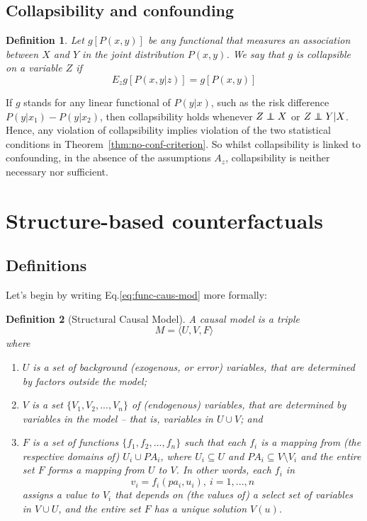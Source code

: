 \documentclass[11pt]{article}
\numberwithin{equation}{section}
\newcommand\indep{\protect\mathpalette{\protect\independenT}{\perp}}
\def\independenT#1#2{\mathrel{\rlap{$#1#2$}\mkern2mu{#1#2}}}
\newtheorem{defn}{Definition}[section]
\begin{document}
\subsection{Collapsibility and confounding}
\begin{defn}
Let $g[P(x,y)]$ be any functional that measures an association between $X$ and $Y$ in the joint distribution $P(x,y)$. We say that $g$ is collapsible on a variable $Z$ if 
\begin{equation}
E_z g[P(x,y|z)] = g[P(x,y)]
\end{equation}
\end{defn}

If $g$ stands for any linear functional of $P(y|x)$, such as the risk difference $P(y|x_1) - P(y|x_2)$, then collapsibility holds whenever $Z \indep X$ or $Z \indep Y| X$. Hence, any violation of collapsibility implies violation of the two statistical conditions in Theorem~\ref{thm:no-conf-criterion}. So whilst collapsibility is linked to confounding, in the absence of the assumptions $A_z$, collapsibility is neither necessary nor sufficient.

\section{Structure-based counterfactuals}
\subsection{Definitions}\label{sec:counterfactual-defs}
Let's begin by writing Eq.\eqref{eq:func-caus-mod} more formally:

\begin{defn}[Structural Causal Model] \label{defn:struct-causal-model}
A causal model is a triple
\begin{equation}
M = \langle U, V, F \rangle \nonumber
\end{equation}
where
\begin{enumerate}[noitemsep]
\item $U$ is a set of background (exogenous, or error) variables, that are determined by factors outside the model;
\item $V$ is a set $\{V_1, V_2,..., V_n \}$ of (endogenous) variables, that are determined by variables in the model -- that is, variables in $U \cup V$; and
\item $F$ is a set of functions $\{f_1, f_2,...,f_n \}$ such that each $f_i$ is a mapping from (the respective domains of) $U_i \cup PA_i$, where $U_i \subseteq U$ and $PA_i \subseteq V \setminus V_i$ and the entire set $F$ forms a mapping from $U$ to $V$. In other words, each $f_i$ in
\begin{equation}
v_i = f_i(pa_i, u_i), \ i=1,...,n \label{eq:structural-equations}
\end{equation}
assigns a value to $V_i$ that depends on (the values of) a select set of variables in $V \cup U$, and the entire set $F$ has a unique solution $V(u)$.
\end{enumerate}
\end{defn}
\end{document}
